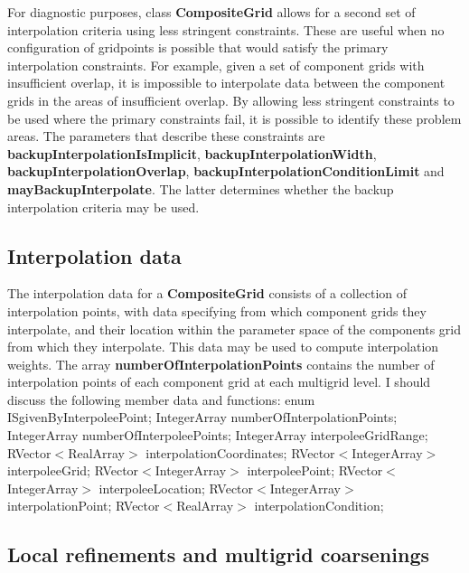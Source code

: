 \documentclass{article}
\begin{document}
For diagnostic purposes, class \textbf{CompositeGrid} allows for a second set of interpolation criteria using less stringent constraints.
These are useful when no configuration of gridpoints is possible that would satisfy the primary interpolation constraints.  For example, given a
set of component grids with insufficient overlap, it is impossible to interpolate data between the component grids in the areas of insufficient
overlap.  By allowing less stringent constraints to be used where the primary constraints fail, it is possible to identify these problem areas.
The parameters that describe these constraints are \textbf{backupInterpolationIsImplicit}, \textbf{backupInterpolationWidth},
\textbf{backupInterpolationOverlap}, \textbf{backupInterpolationConditionLimit} and \textbf{mayBackupInterpolate}.
The latter determines whether the backup interpolation criteria may be used.

\subsection{Interpolation data} 
\label{CompositeGrid:InterpolationData}

The interpolation data for a \textbf{CompositeGrid} consists of a collection of interpolation points, with data specifying from which
component grids they interpolate, and their location within the parameter space of the components grid from which they interpolate.  This data
may be used to compute interpolation weights.  The array \textbf{numberOfInterpolationPoints} contains the number of interpolation points
of each component grid at each multigrid level.
%
I should discuss the following member data and functions:
    enum                         ISgivenByInterpoleePoint;
    IntegerArray                 numberOfInterpolationPoints;
    IntegerArray                 numberOfInterpoleePoints;
    IntegerArray                 interpoleeGridRange;
    RVector$<$RealArray$>$       interpolationCoordinates;
    RVector$<$IntegerArray$>$    interpoleeGrid;
    RVector$<$IntegerArray$>$    interpoleePoint;
    RVector$<$IntegerArray$>$    interpoleeLocation;
    RVector$<$IntegerArray$>$    interpolationPoint;
    RVector$<$RealArray$>$       interpolationCondition;

\subsection{Local refinements and multigrid coarsenings}
\label{CompositeGrid:RefinementsAndCoarsenings}
\end{document}
